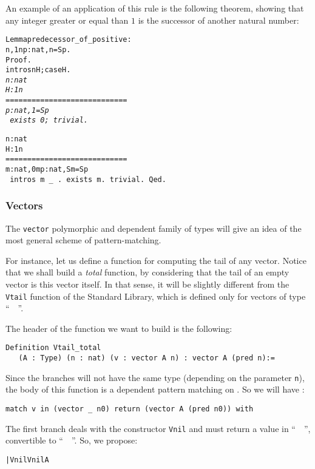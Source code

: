 \documentclass[11pt]{article}
\begin{document}
An example of an application of this rule is the following theorem,
showing that any integer greater or equal than $1$ is the successor of another
natural number:

\begin{alltt}
Lemma predecessor_of_positive :
 {\prodsym} n, 1 {\coqle} n {\arrow} {\exsym} p:nat, n = S p.
Proof.
 intros n H;case H.
\it
  n : nat
  H : 1 {\coqle} n
  ============================
   {\exsym} p : nat, 1 = S p
\tt
  exists 0; trivial.
\it

  n : nat
  H : 1 {\coqle} n
  ============================
   {\prodsym} m : nat, 0 {\coqle} m {\arrow} {\exsym} p : nat, S m = S p
\tt
  intros m _  .
  exists m.
  trivial.
Qed.
\end{alltt}


\subsubsection{Vectors}

The \texttt{vector} polymorphic and dependent family of types will
give an idea of the most general scheme of pattern-matching.

For instance, let us define a function for computing the tail of
any vector. Notice that we shall build a \emph{total} function,
by considering that the tail of an empty vector is this vector itself.
In that sense, it will be slightly different from the \texttt{Vtail}
function of the Standard Library, which is defined only for vectors
of type ``~~''.

The header of the function we want to build is the following:

\begin{verbatim}
Definition Vtail_total
   (A : Type) (n : nat) (v : vector A n) : vector A (pred n):=
\end{verbatim}

Since the branches will not have the same type
(depending on the parameter \texttt{n}),
the body of this function is a dependent pattern matching on
.
So we will have :
\begin{verbatim}
match v in (vector _ n0) return (vector A (pred n0)) with
\end{verbatim}

The first branch  deals with the constructor \texttt{Vnil} and must
return a value in ``~~'', convertible
to ``~~''. So, we propose:
\begin{alltt}
| Vnil {\funarrow} Vnil A
\end{alltt}
\end{document}
